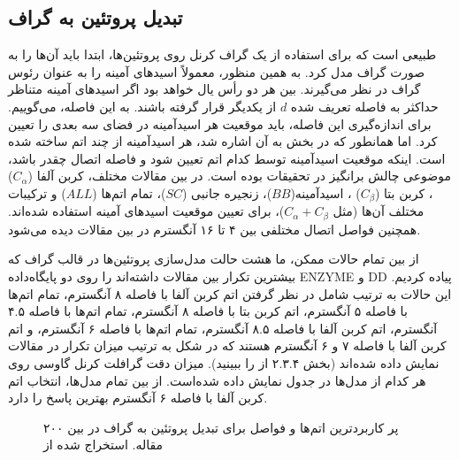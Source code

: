 \subsection{تبدیل پروتئین به گراف}\label{sec:protein-to-graph}
طبیعی است که برای استفاده از یک گراف کرنل روی پروتئین‌ها، ابتدا باید آن‌ها را به صورت گراف مدل کرد. به همین منظور، معمولاً اسید‌های آمینه را به عنوان رئوس گراف در نظر می‌گیرند. بین هر دو رأس یال خواهد بود اگر اسیدهای آمینه متناظر حداکثر به فاصله تعریف شده $d$ از یکدیگر قرار گرفته باشند. به این فاصله،  می‌گوییم. برای اندازه‌گیری این فاصله، باید موقعیت هر اسیدآمینه در فضای سه بعدی را تعیین کرد. اما همانطور که در بخش  به آن اشاره شد، هر اسیدآمینه از چند اتم ساخته شده است. اینکه موقعیت اسیدآمینه توسط کدام اتم تعیین شود و فاصله اتصال چقدر باشد، موضوعی چالش برانگیز در تحقیقات بوده است. در بین مقالات مختلف، کربن آلفا 
($C_\alpha$)
، کربن بتا
($C_\beta$)
،  اسیدآمینه($BB$)، زنجیره جانبی ($SC$)، تمام اتم‌ها ($ALL$) و ترکیبات مختلف آن‌ها (مثل $C_\alpha+C_\beta$)، برای تعیین موقعیت اسید‌های آمینه استفاده شده‌اند. همچنین فواصل اتصال مختلفی بین ۴ تا ۱۶ آنگسترم در بین مقالات دیده می‌شود.

از بین تمام حالات ممکن، ما هشت حالت مدل‌سازی پروتئین‌ها در قالب گراف که بیشترین تکرار بین مقالات داشته‌اند را روی دو پایگاه‌داده ENZYME و DD پیاده کردیم. این حالات به ترتیب شامل در نظر گرفتن اتم کربن آلفا با فاصله ۸ آنگسترم، تمام اتم‌ها با فاصله ۵ آنگسترم، اتم کربن بتا با فاصله ۸ آنگسترم، تمام اتم‌ها با فاصله ۴.۵ آنگسترم، اتم کربن آلفا با فاصله ۸.۵ آنگسترم، تمام اتم‌ها با فاصله ۶ آنگسترم، و اتم کربن آلفا با فاصله ۷ و ۶ آنگسترم هستند که در شکل  به ترتیب میزان تکرار در مقالات نمایش داده شده‌اند (بخش ۲.۳.۴ از  را ببینید). میزان دقت گرافلت کرنل گاوسی روی هر کدام از مدل‌ها در جدول  نمایش داده شده‌است. از بین تمام مدل‌ها، انتخاب اتم کربن آلفا با فاصله ۶ آنگسترم بهترین پاسخ را دارد.

\begin{figure}[ht]
\caption{پر کاربرد‌ترین اتم‌ها و فواصل برای تبدیل پروتئین به گراف در بین ۲۰۰ مقاله. استخراج شده از }
\label{fig:rig-occurance}
\end{figure}

